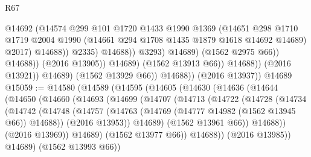 \begin{lexlean}{R67}
\begin{coremodule}
                                            @14692
                                            (@14574
                                              @299
                                              @101
                                              @1720
                                              @1433
                                              @1990
                                              @1369
                                              (@14651
                                                @298
                                                @1710
                                                @1719
                                                @2004
                                                @1990
                                                (@14661 @294 @1708 @1435 @1879 @1618 @14692 @14689)
                                                @2017)
                                              @14688))
                                          @2335)
                                        @14688))
                                    @3293)
                                  @14689)
                                (@1562 @2975 @66))
                              @14688))
                          (@2016 @13905))
                        @14689)
                      (@1562 @13913 @66))
                    @14688))
                (@2016 @13921))
              @14689)
            (@1562 @13929 @66))
          @14688))
      (@2016 @13937))
    @14689
@15059 := @14580
    (@14589
      (@14595
        (@14605
          (@14630
            (@14636
              (@14644
                (@14650
                  (@14660
                    (@14693
                      (@14699
                        (@14707
                          (@14713
                            (@14722
                              (@14728
                                (@14734
                                  (@14742
                                    (@14748
                                      (@14757
                                        (@14763 (@14769 (@14777 @14982 (@1562 @13945 @66)) @14688))
                                        (@2016 @13953))
                                      @14689)
                                    (@1562 @13961 @66))
                                  @14688))
                              (@2016 @13969))
                            @14689)
                          (@1562 @13977 @66))
                        @14688))
                    (@2016 @13985))
                  @14689)
                (@1562 @13993 @66))

\end{coremodule}
\end{lexlean}
